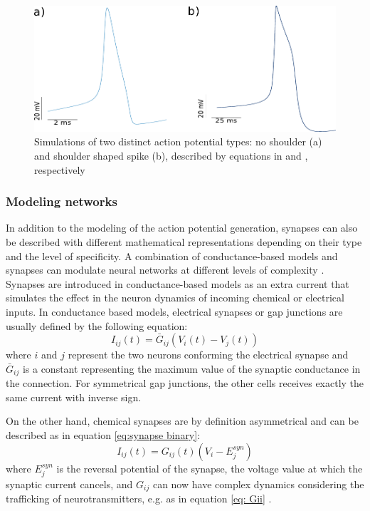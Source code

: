 \begin{figure}[htb!]
	\includegraphics[width=\textwidth]{img/intro/spike-types model.pdf}
	\caption{Simulations of two distinct action potential types: no shoulder (a) and shoulder shaped spike (b), described by equations in \textcite{hodgkin_quantitative_1952} and \textcite{vavoulis_balanced_2010}, respectively}
	\label{fig:spike-types model}
\end{figure}

\subsubsection{\large{Modeling networks}}
\label{c-intro-synapses}
In addition to the modeling of the action potential generation, synapses can also be described with different mathematical representations depending on their type and the level of specificity. A combination of conductance-based models and synapses can modulate neural networks at different levels of complexity \parencite{aguirre_pattern_2007,latorre_transient_2013,huerta_topology_2001}. Synapses are introduced in conductance-based models as an extra current that simulates the effect in the neuron dynamics of incoming chemical or electrical inputs. In conductance based models, electrical synapses or gap junctions are usually defined by the following equation:
\begin{equation}
    I_{ij}(t) = \bar{G}_{ij} (V_i(t) - V_j(t))
\end{equation}
\noindent where $i$ and $j$ represent the two neurons conforming the electrical synapse and $\bar{G}_{ij}$ is a constant representing the maximum value of the  synaptic conductance in the connection. For symmetrical gap junctions, the other cells receives exactly the same current with inverse sign.

On the other hand, chemical synapses are by definition asymmetrical and can be described as in equation \ref{eq:synapse binary}:
\begin{equation}
     I_{ij}(t) = G_{ij}(t) (V_i - E_j^{syn})
     \label{eq:synapse binary}
\end{equation}
\noindent where $E_j^{syn}$ is the reversal potential of the synapse, the voltage value at which the synaptic current cancels, and $G_{ij}$ can now have complex dynamics considering the trafficking of neurotransmitters, e.g. as in equation \ref{eq: Gii} \parencite{torres_modeling_2012}. 

